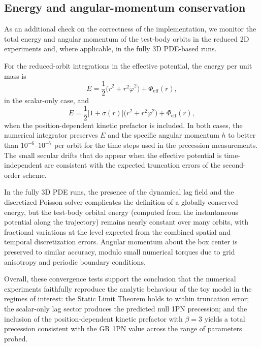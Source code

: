 \documentclass[11pt]{article}
\begin{document}
\subsection{Energy and angular-momentum conservation}
\label{app:numerics_energy}

As an additional check on the correctness of the implementation, we monitor the total energy and angular momentum of the test-body orbits in the reduced 2D experiments and, where applicable, in the fully 3D PDE-based runs.

For the reduced-orbit integrations in the effective potential, the energy per unit mass is
\begin{equation}
  E
  = \frac{1}{2}\bigl(\dot{r}^2 + r^2\dot{\varphi}^2\bigr)
    + \Phi_{\mathrm{eff}}(r),
\end{equation}
in the scalar-only case, and
\begin{equation}
  E
  = \frac{1}{2}\bigl[1 + \sigma(r)\bigr]
    \bigl(\dot{r}^2 + r^2\dot{\varphi}^2\bigr)
    + \Phi_{\mathrm{eff}}(r),
\end{equation}
when the position-dependent kinetic prefactor is included. In both cases, the numerical integrator preserves $E$ and the specific angular momentum $h$ to better than $10^{-6}$--$10^{-7}$ per orbit for the time steps used in the precession measurements. The small secular drifts that do appear when the effective potential is time-independent are consistent with the expected truncation errors of the second-order scheme.

In the fully 3D PDE runs, the presence of the dynamical lag field and the discretized Poisson solver complicates the definition of a globally conserved energy, but the test-body orbital energy (computed from the instantaneous potential along the trajectory) remains nearly constant over many orbits, with fractional variations at the level expected from the combined spatial and temporal discretization errors. Angular momentum about the box center is preserved to similar accuracy, modulo small numerical torques due to grid anisotropy and periodic boundary conditions.

\medskip

Overall, these convergence tests support the conclusion that the numerical experiments faithfully reproduce the analytic behaviour of the toy model in the regimes of interest: the Static Limit Theorem holds to within truncation error; the scalar-only lag sector produces the predicted null 1PN precession; and the inclusion of the position-dependent kinetic prefactor with $\beta = 3$ yields a total precession consistent with the GR 1PN value across the range of parameters probed.
\end{document}
